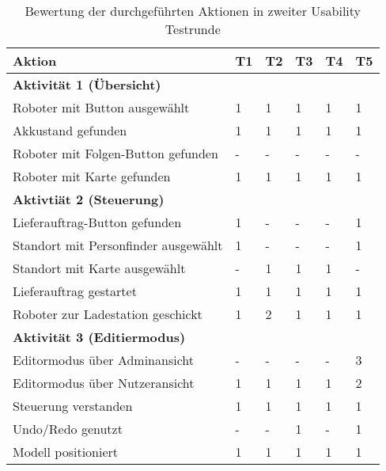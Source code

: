 \begin{table}[H]
    \caption{Bewertung der durchgeführten Aktionen in zweiter Usability Testrunde}\label{tbl:2ndUsabilityTestsActions}
    \begin{tabular}{l|lllll}
        Aktion                              & T1    & T2    & T3    & T4    & T5    \\ \hline
        \textbf{Aktivität 1 (Übersicht)}    &       &       &       &       &       \\
        Roboter mit Button ausgewählt       & 1     & 1     & 1     & 1     & 1     \\
        Akkustand gefunden                  & 1     & 1     & 1     & 1     & 1     \\
        Roboter mit Folgen-Button gefunden  & -     & -     & -     & -     & -     \\
        Roboter mit Karte gefunden          & 1     & 1     & 1     & 1     & 1     \\ \hline
        \textbf{Aktivtiät 2 (Steuerung)}    &       &       &       &       &       \\
        Lieferauftrag-Button gefunden       & 1     & -     & -     & -     & 1     \\
        Standort mit Personfinder ausgewählt& 1     & -     & -     & -     & 1     \\
        Standort mit Karte ausgewählt       & -     & 1     & 1     & 1     & -     \\
        Lieferauftrag gestartet             & 1     & 1     & 1     & 1     & 1     \\
        Roboter zur Ladestation geschickt   & 1     & 2     & 1     & 1     & 1     \\ \hline
        \textbf{Aktivität 3 (Editiermodus)} &       &       &       &       &       \\
        Editormodus über Adminansicht       & -     & -     & -     & -     & 3     \\
        Editormodus über Nutzeransicht      & 1     & 1     & 1     & 1     & 2     \\
        Steuerung verstanden                & 1     & 1     & 1     & 1     & 1     \\
        Undo/Redo genutzt                   & -     & -     & 1     & -     & 1     \\
        Modell positioniert                 & 1     & 1     & 1     & 1     & 1     \\
    \end{tabular}
\end{table}

